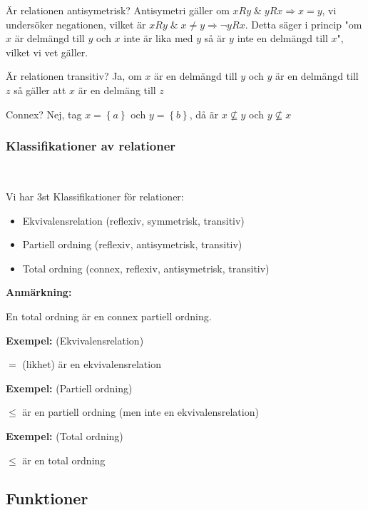 \par\bigskip
\noindent Är relationen antisymetrisk? Antisymetri gäller om $xRy\;\&\;yRx\Rightarrow x=y$, vi undersöker negationen, vilket är $xRy\;\&\; x\neq y\Rightarrow\neg yRx$. Detta säger i princip "om $x$ är delmängd till $y$ och $x$ inte är lika med $y$ så är $y$ inte en delmängd till $x$", vilket vi vet gäller.
\par\bigskip
\noindent Är relationen transitiv? Ja, om $x$ är en delmängd till $y$ och $y$ är en delmängd till $z$ så gäller att $x$ är en delmäng till $z$
\par\bigskip
\noindent Connex? Nej, tag $x = \left\{a\right\}$ och $y = \left\{b\right\}$, då är $x\not\subseteq y$ och $y\not\subseteq x$
\par\bigskip
\subsubsection{Klassifikationer av relationer}\hfill\\\par
\noindent Vi har 3st Klassifikationer för relationer:\par
\begin{itemize}
  \item Ekvivalensrelation (reflexiv, symmetrisk, transitiv)
  \item Partiell ordning (reflexiv, antisymetrisk, transitiv)
  \item Total ordning (connex, reflexiv, antisymetrisk, transitiv)
\end{itemize}
\par\bigskip
\noindent\textbf{Anmärkning:}\par
\noindent En total ordning är en connex partiell ordning.
\par\bigskip
\noindent\textbf{Exempel:} (Ekvivalensrelation)\par
\noindent $=$ (likhet) är en ekvivalensrelation
\par\bigskip
\noindent\textbf{Exempel:} (Partiell ordning)\par
\noindent $\leq$  är en partiell ordning (men inte en ekvivalensrelation)
\par\bigskip
\noindent\textbf{Exempel:} (Total ordning)\par
\noindent $\leq$ är en total ordning 
\par\bigskip
\subsection{Funktioner}\hfill\\\par
